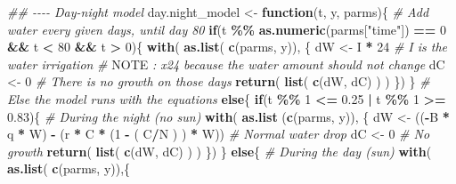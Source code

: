 \documentclass[
]{article}
\newenvironment{Shaded}{\begin{snugshade}}{\end{snugshade}}
\newcommand{\AlertTok}[1]{\textcolor[rgb]{0.94,0.16,0.16}{#1}}
\newcommand{\CommentTok}[1]{\textcolor[rgb]{0.56,0.35,0.01}{\textit{#1}}}
\newcommand{\ControlFlowTok}[1]{\textcolor[rgb]{0.13,0.29,0.53}{\textbf{#1}}}
\newcommand{\DecValTok}[1]{\textcolor[rgb]{0.00,0.00,0.81}{#1}}
\newcommand{\FloatTok}[1]{\textcolor[rgb]{0.00,0.00,0.81}{#1}}
\newcommand{\KeywordTok}[1]{\textcolor[rgb]{0.13,0.29,0.53}{\textbf{#1}}}
\newcommand{\NormalTok}[1]{#1}
\newcommand{\OperatorTok}[1]{\textcolor[rgb]{0.81,0.36,0.00}{\textbf{#1}}}
\newcommand{\StringTok}[1]{\textcolor[rgb]{0.31,0.60,0.02}{#1}}
\begin{document}
\begin{Shaded}
\begin{Highlighting}[numbers=left,,]
\CommentTok{\#\# {-}{-}{-}{-} Day{-}night model}
\NormalTok{day.night\_model \textless{}{-}}\StringTok{ }\ControlFlowTok{function}\NormalTok{(t, y, parms)\{}
  \CommentTok{\# Add water every given days, until day 80}
  \ControlFlowTok{if}\NormalTok{(t }\OperatorTok{\%\%}\StringTok{ }\KeywordTok{as.numeric}\NormalTok{(parms[}\StringTok{"time"}\NormalTok{]) }\OperatorTok{==}\StringTok{ }\DecValTok{0} \OperatorTok{\&\&}\StringTok{ }\NormalTok{t }\OperatorTok{\textless{}}\StringTok{ }\DecValTok{80} \OperatorTok{\&\&}\StringTok{ }\NormalTok{t }\OperatorTok{\textgreater{}}\StringTok{ }\DecValTok{0}\NormalTok{)\{}
    \KeywordTok{with}\NormalTok{( }\KeywordTok{as.list}\NormalTok{( }\KeywordTok{c}\NormalTok{(parms, y)), \{}
\NormalTok{      dW \textless{}{-}}\StringTok{ }\NormalTok{I }\OperatorTok{*}\StringTok{ }\DecValTok{24} \CommentTok{\# I is the water irrigation}
      \CommentTok{\# }\AlertTok{NOTE}\CommentTok{ : x24 because the water amount should not change}
\NormalTok{      dC \textless{}{-}}\StringTok{ }\DecValTok{0} \CommentTok{\# There is no growth on those days}
      \KeywordTok{return}\NormalTok{( }\KeywordTok{list}\NormalTok{( }\KeywordTok{c}\NormalTok{(dW, dC) ) )}
\NormalTok{    \})}
\NormalTok{  \}}
  \CommentTok{\# Else the model runs with the equations}
  \ControlFlowTok{else}\NormalTok{\{}
    \ControlFlowTok{if}\NormalTok{(t }\OperatorTok{\%\%}\StringTok{ }\DecValTok{1} \OperatorTok{\textless{}=}\StringTok{ }\FloatTok{0.25} \OperatorTok{|}\StringTok{ }\NormalTok{t }\OperatorTok{\%\%}\StringTok{ }\DecValTok{1} \OperatorTok{\textgreater{}=}\StringTok{ }\FloatTok{0.83}\NormalTok{)\{}
      \CommentTok{\# During the night (no sun)}
      \KeywordTok{with}\NormalTok{( }\KeywordTok{as.list}\NormalTok{ (}\KeywordTok{c}\NormalTok{(parms, y)), \{}
\NormalTok{        dW \textless{}{-}}\StringTok{ }\NormalTok{((}\OperatorTok{{-}}\NormalTok{B }\OperatorTok{*}\StringTok{ }\NormalTok{q }\OperatorTok{*}\StringTok{ }\NormalTok{W) }\OperatorTok{{-}}\StringTok{ }\NormalTok{(r }\OperatorTok{*}\StringTok{ }\NormalTok{C }\OperatorTok{*}\StringTok{ }\NormalTok{(}\DecValTok{1} \OperatorTok{{-}}\StringTok{ }\NormalTok{( C}\OperatorTok{/}\NormalTok{N ) ) }\OperatorTok{*}\StringTok{ }\NormalTok{W)) }\CommentTok{\# Normal water drop}
\NormalTok{        dC \textless{}{-}}\StringTok{ }\DecValTok{0} \CommentTok{\# No growth}
        \KeywordTok{return}\NormalTok{( }\KeywordTok{list}\NormalTok{( }\KeywordTok{c}\NormalTok{(dW, dC) ) )}
\NormalTok{        \})}
\NormalTok{    \}}
    \ControlFlowTok{else}\NormalTok{\{}
      \CommentTok{\# During the day (sun)}
      \KeywordTok{with}\NormalTok{( }\KeywordTok{as.list}\NormalTok{( }\KeywordTok{c}\NormalTok{(parms, y)),\{}

\end{Highlighting}
\end{Shaded}
\end{document}
